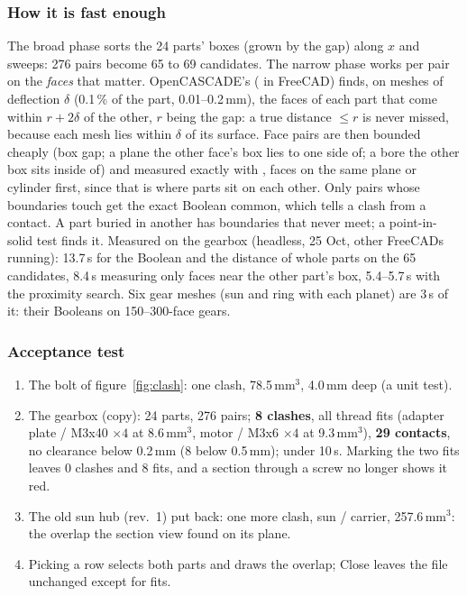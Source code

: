 \subsubsection*{How it is fast enough}

The broad phase sorts the 24 parts' boxes (grown by the gap) along $x$ and sweeps: 276 pairs become 65 to 69
candidates. The narrow phase works per pair on the \emph{faces} that matter. OpenCASCADE's
 ( in FreeCAD) finds, on meshes of deflection $\delta$
(0.1\,\% of the part, 0.01--0.2\,mm), the faces of each part that come within $r+2\delta$ of the other, $r$ being
the gap: a true distance $\le r$ is never missed, because each mesh lies within $\delta$ of its surface. Face pairs
are then bounded cheaply (box gap; a plane the other face's box lies to one side of; a bore the other box sits inside
of) and measured exactly with , faces on the same plane or cylinder first, since that is where
parts sit on each other. Only pairs whose boundaries touch get the exact Boolean common, which tells a clash from a
contact. A part buried in another has boundaries that never meet; a point-in-solid test finds it. Measured on the
gearbox (headless, 25 Oct, other FreeCADs running): 13.7\,s for the Boolean and the distance of whole parts on the
65 candidates, 8.4\,s measuring only faces near the other part's box, 5.4--5.7\,s with the proximity search. Six gear meshes (sun and ring with each planet) are 3\,s of it: their
Booleans on 150--300-face gears.

\subsubsection*{Acceptance test}

\begin{enumerate}[nosep]
  \item The bolt of figure~\ref{fig:clash}: one clash, 78.5\,mm$^3$, 4.0\,mm deep (a unit test).
  \item The gearbox  (copy): 24 parts, 276 pairs; \textbf{8 clashes}, all thread fits (adapter
    plate / M3x40 $\times4$ at 8.6\,mm$^3$, motor / M3x6 $\times4$ at 9.3\,mm$^3$), \textbf{29 contacts}, no clearance
    below 0.2\,mm (8 below 0.5\,mm); under 10\,s. Marking the two fits leaves 0 clashes and 8 fits, and a section
    through a screw no longer shows it red.
  \item The old sun hub (rev.~1) put back: one more clash, sun / carrier, 257.6\,mm$^3$: the overlap the section
    view found on its plane.
  \item Picking a row selects both parts and draws the overlap; Close leaves the file unchanged except for fits.
\end{enumerate}


